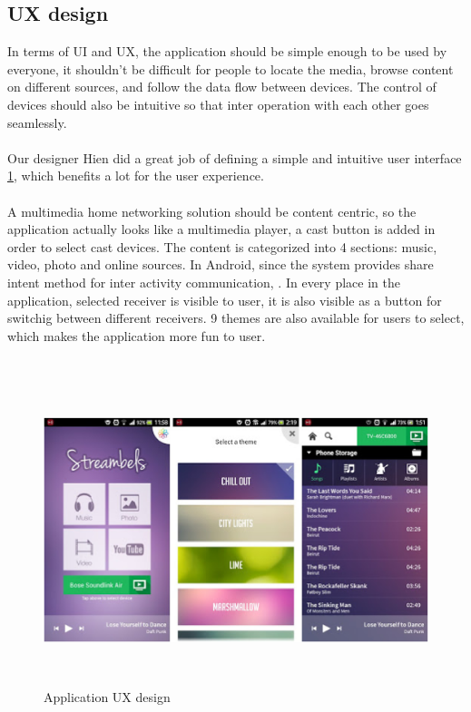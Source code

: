 \subsection{UX design}
In terms of UI and UX, the application should be simple enough to be used by
everyone, it shouldn't be difficult for people to locate the media, browse
content on different sources, and follow the data flow between devices. The
control of devices should also be intuitive so that inter operation with
each other goes seamlessly.\\
\\
Our designer Hien did a great job of defining a simple and intuitive user
interface \ref{chart5}, which benefits a lot for the user experience.\\
\\
A multimedia home networking solution should be content centric, so the
application actually looks like a multimedia player, a cast button is added in
order to select cast devices. The content is categorized into 4 sections: music,
video, photo and online sources. In Android, since the system provides share
intent method for inter activity communication, . In every place in the
application, selected receiver is visible to user, it is also visible as a
button for switchig between different receivers. 9 themes are also available
for users to select, which makes the application more fun to user.\\
\\
\begin{figure}[htb]
\centering \includegraphics[height=9cm]{charts/streambels_ui}
\caption{Application UX design \label{chart5}}
\end{figure}

